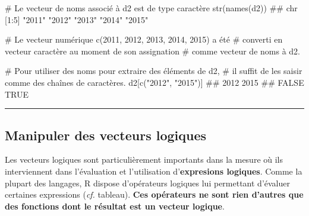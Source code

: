\documentclass[12pt,twosided, notitlepage]{book}
\newenvironment{Shaded}{}{}
\newcommand{\KeywordTok}[1]{\textcolor[rgb]{0.00,0.00,1.00}{{#1}}}
\newcommand{\StringTok}[1]{\textcolor[rgb]{0.00,0.50,0.50}{{#1}}}
\newcommand{\CommentTok}[1]{\textcolor[rgb]{0.00,0.50,0.00}{{#1}}}
\newcommand{\NormalTok}[1]{{#1}}
\renewenvironment{Shaded}{\begin{snugshade}}{\end{snugshade}}
\begin{document}
\begin{enumerate}
\begin{Shaded}
\begin{Highlighting}[]
\CommentTok{# Le vecteur de noms associé à d2 est de type caractère}
\KeywordTok{str}\NormalTok{(}\KeywordTok{names}\NormalTok{(d2))}
  \NormalTok{##  chr [1:5] "2011" "2012" "2013" "2014" "2015"}

\CommentTok{# Le vecteur numérique c(2011, 2012, 2013, 2014, 2015) a été }
\CommentTok{# converti en vecteur caractère au moment de son assignation }
\CommentTok{# comme vecteur de noms à d2. }

\CommentTok{# Pour utiliser des noms pour extraire des éléments de d2,}
\CommentTok{# il suffit de les saisir comme des chaînes de caractères.}
\NormalTok{d2[}\KeywordTok{c}\NormalTok{(}\StringTok{"2012"}\NormalTok{, }\StringTok{"2015"}\NormalTok{)]}
  \NormalTok{##  2012  2015 }
  \NormalTok{## FALSE  TRUE}
\end{Highlighting}
\end{Shaded}

  \begin{center} \rule{0.5\linewidth}{\linethickness}\end{center}

  \bigskip  \fi 
\end{enumerate}

\subsection{Manipuler des vecteurs
logiques}\label{manipuler-des-vecteurs-logiques}

Les vecteurs logiques sont particulièrement importants dans la mesure où
ils interviennent dans l'évaluation et l'utilisation
d'\textbf{expresions logiques}. Comme la plupart des langages, R dispose
d'opérateurs logiques lui permettant d'évaluer certaines expressions
(\emph{cf.} tableau). \textbf{Ces opérateurs ne sont rien d'autres que
des fonctions dont le résultat est un vecteur logique}.
\end{document}
